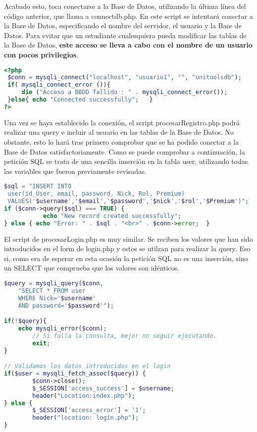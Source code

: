 \documentclass[12pt]{report}
\begin{document}
Acabado esto, toca conectarse a la Base de Datos, utilizando la última línea del código anterior, que llama a connectdb.php. En este script se intentará conectar a la Base de Datos,
especificando el nombre del servidor, el usuario y la Base de Datos. Para evitar que un estudiante cualesquiera pueda modificar las tablas de la Base de Datos, \textbf{este acceso se lleva a cabo con el nombre de un usuario con pocos privilegios}.
\newline
\begin{lstlisting}[language=PHP]
<?php
 $conn = mysqli_connect("localhost", "usuario1", "", "unitoolsdb");
 if( mysqli_connect_error ()){
     die ("Acceso a BBDD fallido : " . mysqli_connect_error());
 }else{ echo "Connected successfully";   }
?>
\end{lstlisting}
Una vez se haya establecido la conexión, el script procesarRegistro.php podrá realizar una query e incluir al usuario en las tablas de la Base de Datos. No obstante, esto lo hará tras primero comprobar que se ha podido conectar a la Base de Datos satisfactoriamente. Como se puede comprobar a continuación, la petición SQL se trata de una sencilla inserción en la tabla user, utilizando todas las variables que fueron previamente revisadas.

\begin{lstlisting}[language=PHP]
$sql = "INSERT INTO 
 user(id_User, email, password, Nick, Rol, Premium) 
 VALUES('$username','$email','$password','$nick','$rol','$Premium')";
if ($conn->query($sql) === TRUE) {
           echo "New record created successfully";
} else { echo "Error: " . $sql . "<br>" . $conn->error;  }  
\end{lstlisting}

El script de procesarLogin.php es muy similar. Se reciben los valores que han sido introducidos en el form de login.php y estos se utilzan para realizar la query. Eso si, como era de esperar en esta ocasión la petición SQL no es una inserción, sino un SELECT que comprueba que los valores son idénticos.
\newline
\begin{lstlisting}[language=PHP]
$query = mysqli_query($conn, 
    "SELECT * FROM user 
    WHERE Nick='$username' 
    AND password='$password'");

if(!$query){ 
    echo mysqli_error($conn);
        // Si falla la consulta, mejor no seguir ejecutando.
        exit;
} 

// Validamos los datos introducidos en el login
if($user = mysqli_fetch_assoc($query)) {
        $conn->close();
        $_SESSION['access_success'] = $username;
        header("Location:index.php");
} else {
        $_SESSION['access_error'] = '1';
        header("location: login.php");
}
\end{lstlisting}
\end{document}
